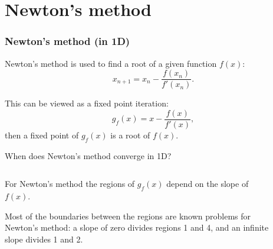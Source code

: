 \documentclass{beamer}
\begin{document}
\section{Newton's method}

\begin{frame}
\frametitle{Newton's method (in 1D)}

Newton's method is used to find a root of a given function $f(x)$:
\begin{equation*}
	x_{n+1} = x_n - \frac{f(x_n)}{f'(x_n)}.
\end{equation*}

This can be viewed as a fixed point iteration:
\begin{equation*}
	g_f(x) = x - \frac{f(x)}{f'(x)},
\end{equation*}
then a fixed point of $g_f(x)$ is a root of $f(x)$.

\end{frame}

\begin{frame}{When does Newton's method converge in 1D?}
    \begin{columns}
        \begin{column}{0.5\textwidth}
            For Newton's method the regions of $g_f(x)$ depend on the slope of $f(x)$.
            
            Most of the boundaries between the regions are known problems for Newton's method:
            a slope of zero divides regions 1 and 4, and an infinite slope divides 1 and 2.
        \end{column}
        \begin{column}{0.5\textwidth}
            \begin{figure}
                \centering
                \label{fig:NR1}
            \end{figure}
        \end{column}
    \end{columns}
\end{frame}
\end{document}
